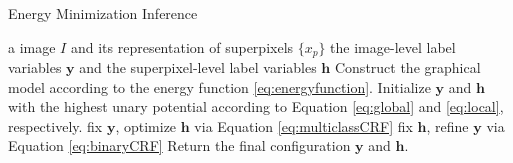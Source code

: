 \renewcommand{\algorithmicrequire}{\textbf{Input:}}  %
\renewcommand{\algorithmicensure}{\textbf{Output:}} %

\begin{algorithm}
\caption{Energy Minimization Inference}
\label{alg:energy}
\begin{algorithmic}[1]
    \Require
    a image $I$ and its representation of superpixels $\{x_p\}$
    \Ensure
    the image-level label variables $\boldsymbol{y}$ and the superpixel-level label variables $\boldsymbol{h}$
    \State Construct the graphical model according to the energy function \eqref{eq:energyfunction}.
    \State Initialize $\boldsymbol{y}$ and $\boldsymbol{h}$ with the highest unary potential according to Equation \eqref{eq:global} and \eqref{eq:local}, respectively.
        \State fix $\boldsymbol{y}$, optimize $\boldsymbol{h}$ via Equation \eqref{eq:multiclassCRF}
        \State fix $\boldsymbol{h}$, refine $\boldsymbol{y}$ via Equation \eqref{eq:binaryCRF}
    \EndFor
    \State Return the final configuration $\boldsymbol{y}$ and $\boldsymbol{h}$.
\end{algorithmic}
\end{algorithm}
